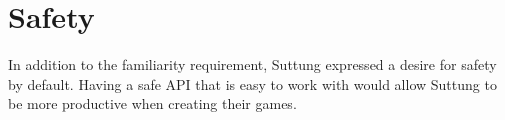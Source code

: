 \section{Safety}
In addition to the familiarity requirement, Suttung expressed a desire for safety by default.
Having a safe API that is easy to work with would allow Suttung to be more productive when creating their games.

